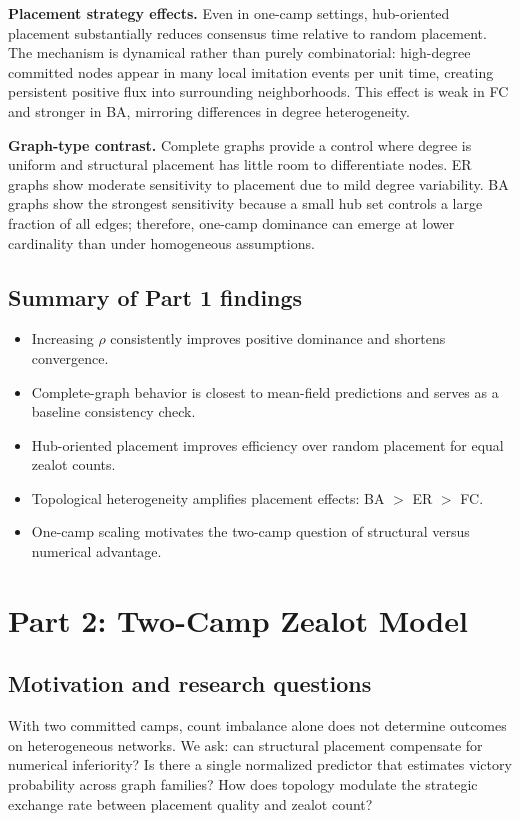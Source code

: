 \documentclass[12pt, a4paper]{article}
\begin{document}
\noindent
\textbf{Placement strategy effects.}
Even in one-camp settings, hub-oriented placement substantially reduces consensus time relative to random placement. The mechanism is dynamical rather than purely combinatorial: high-degree committed nodes appear in many local imitation events per unit time, creating persistent positive flux into surrounding neighborhoods. This effect is weak in FC and stronger in BA, mirroring differences in degree heterogeneity.

\noindent
\textbf{Graph-type contrast.}
Complete graphs provide a control where degree is uniform and structural placement has little room to differentiate nodes. ER graphs show moderate sensitivity to placement due to mild degree variability. BA graphs show the strongest sensitivity because a small hub set controls a large fraction of all edges; therefore, one-camp dominance can emerge at lower cardinality than under homogeneous assumptions.

\subsection{Summary of Part 1 findings}
\begin{itemize}
\item Increasing $\rho$ consistently improves positive dominance and shortens convergence.
\item Complete-graph behavior is closest to mean-field predictions and serves as a baseline consistency check.
\item Hub-oriented placement improves efficiency over random placement for equal zealot counts.
\item Topological heterogeneity amplifies placement effects: BA $>$ ER $>$ FC.
\item One-camp scaling motivates the two-camp question of structural versus numerical advantage.
\end{itemize}

\section{Part 2: Two-Camp Zealot Model}\label{sec:part2}
\subsection{Motivation and research questions}
With two committed camps, count imbalance alone does not determine outcomes on heterogeneous networks. We ask: can structural placement compensate for numerical inferiority? Is there a single normalized predictor that estimates victory probability across graph families? How does topology modulate the strategic exchange rate between placement quality and zealot count?
\end{document}
